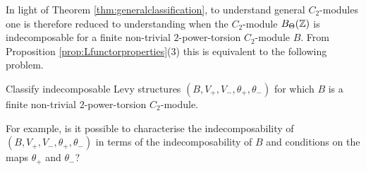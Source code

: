 In light of Theorem \ref{thm:generalclassification}, to understand general $C_2$-modules one is therefore reduced to understanding when the $C_2$-module $B_{\Theta}({\mathbb Z})$ is indecomposable for a finite non-trivial $2$-power-torsion $C_2$-module $B$. From Proposition \ref{prop:Lfunctorproperties}(3) this is equivalent to the following problem.

\begin{prob}
Classify indecomposable Levy structures $(B, V_+, V_-, \theta_+, \theta_-)$ for which $B$ is a finite non-trivial $2$-power-torsion $C_2$-module.
\end{prob}

For example, is it possible to characterise the indecomposability of $(B, V_+, V_-, \theta_+, \theta_-)$ in terms of the indecomposability of $B$ and conditions on the maps $\theta_+$ and $\theta_-$?
